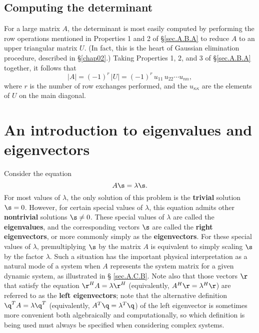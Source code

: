 \subsection{Computing the determinant}\label{sec.A.B.B}

For a large matrix $A$, the determinant is most easily computed by
performing the row operations mentioned in Properties 1 and 2
of \S \ref{sec.A.B.A} to reduce $A$ to an upper triangular
matrix $U$.  (In fact, this is the heart of Gaussian elimination
procedure, described in \S \ref{chap02}.)  Taking Properties 1, 2, and
3 of \S \ref{sec.A.B.A} together, it follows that
\begin{equation*}
|A| = (-1)^r\,|U| = (-1)^r\,u_{11}\,u_{22}\cdots u_{nn},
\end{equation*}
where $r$ is the number of row exchanges performed, and the
$u_{\kappa\kappa}$ are the elements of $U$ on the main
diagonal.  

\section{An introduction to eigenvalues and eigenvectors}\label{sec.A.C}

Consider the equation
\begin{equation}
A\s = \lambda \s.
\label{emodedef}
\end{equation}
For most values of $\lambda$, the only solution of this problem is the
{\bf trivial} solution $\s=0$.  However, for certain special values of
$\lambda$, this equation admits other {\bf nontrivial} solutions $\s\ne
0$.  These special values of $\lambda$ are called the {\bf
eigenvalues}, and the corresponding vectors $\s$ are called the {\bf
right eigenvectors}, or more commonly simply as the {\bf
eigenvectors}.  For these special values of $\lambda$, premultiplying
$\s$ by the matrix $A$ is equivalent to simply scaling $\s$ by the
factor $\lambda$.  Such a situation has the important physical
interpretation as a natural mode of a system when $A$ represents the
system matrix for a given dynamic system, as illustrated in \S
\ref{sec.A.C.B}.  Note also that those vectors $\r$ that satisfy the
equation $\r^{H} A = \lambda \r^{H}$ (equivalently, $A^{H}\r=\lambda^{H} \r$) are referred to as the {\bf left eigenvectors};
note that the alternative definition $\q^{T} A = \lambda \q^{T}$  (equivalently, $A^{T}\q=\lambda^{T} \q$)
of the left eigenvector is sometimes more convenient both algebraically and computationally,
so which definition is being used must always be specified when considering complex systems.

